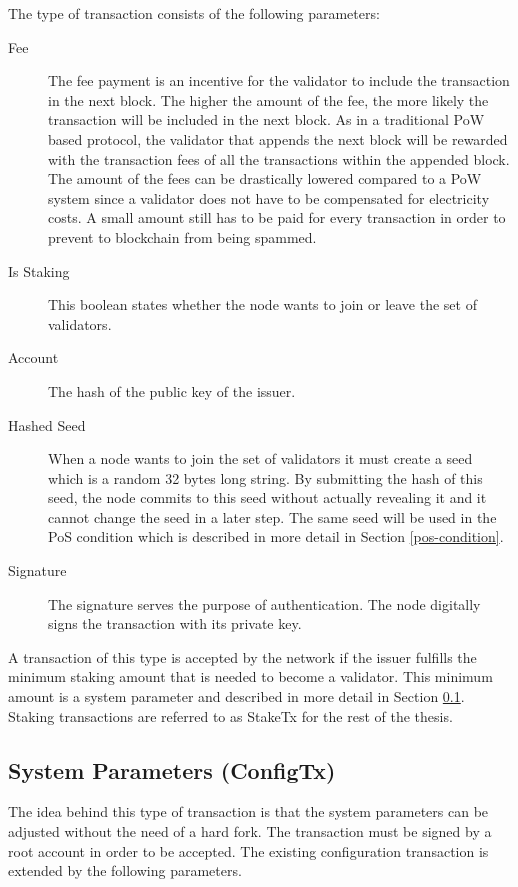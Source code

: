 The type of transaction consists of the following parameters:

\begin{description}
	\item[Fee] The fee payment is an incentive for the validator to include the transaction in the next block. The higher the amount of the fee, the more likely the transaction will be included in the next block. As in a traditional PoW based protocol, the validator that appends the next block will be rewarded with the transaction fees of all the transactions within the appended block. The amount of the fees can be drastically lowered compared to a PoW system since a validator does not have to be compensated for electricity costs. A small amount still has to be paid for every transaction in order to prevent to blockchain from being spammed.    
	
	\item[Is Staking] This boolean states whether the node wants to join or leave the set of validators.
	
	\item[Account] The hash of the public key of the issuer.
		
	\item[Hashed Seed] When a node wants to join the set of validators it must create a seed which is a random 32 bytes long string. By submitting the hash of this seed, the node commits to this seed without actually revealing it and it cannot change the seed in a later step. The same seed will be used in the PoS condition which is described in more detail in Section \ref{pos-condition}.
	
	\item[Signature] The signature serves the purpose of authentication. The node digitally signs the transaction with its private key.
\end{description}

A transaction of this type is accepted by the network if the issuer fulfills the minimum staking amount that is needed to become a validator. This minimum amount is a system parameter and described in more detail in Section \ref{system-parameters}.
Staking transactions are referred to as StakeTx for the rest of the thesis.


\subsection{System Parameters (ConfigTx)}\label{system-parameters}
The idea behind this type of transaction is that the system parameters can be adjusted without the need of a hard fork. The transaction must be signed by a root account in order to be accepted. The existing configuration transaction is extended by the following parameters. 


